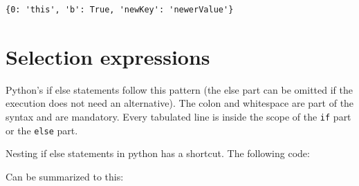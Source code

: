\begin{verbatim}
{0: 'this', 'b': True, 'newKey': 'newerValue'}
\end{verbatim}

\section{Selection
expressions}\label{python-introduction.md__selection-expressions}

Python's if else statements follow this pattern (the else part can be
omitted if the execution does not need an alternative). The colon and
whitespace are part of the syntax and are mandatory. Every tabulated
line is inside the scope of the \texttt{if} part or the \texttt{else}
part.

\begin{Shaded}
\begin{Highlighting}[]
\NormalTok{:}
\end{Highlighting}
\end{Shaded}

Nesting if else statements in python has a shortcut. The following code:

\begin{Shaded}
\begin{Highlighting}[]
 \NormalTok{:}
    \NormalTok{(}\NormalTok{)}
\NormalTok{:}
     \NormalTok{:}
        \NormalTok{(}\NormalTok{)}
    \NormalTok{:}
        \NormalTok{(}\NormalTok{)}
\end{Highlighting}
\end{Shaded}

Can be summarized to this:

\begin{Shaded}
\begin{Highlighting}[]
 \NormalTok{:}
    \NormalTok{(}\NormalTok{)}
 \NormalTok{:}
    \NormalTok{(}\NormalTok{)}
\NormalTok{:}
    \NormalTok{(}\NormalTok{)}
\end{Highlighting}
\end{Shaded}

